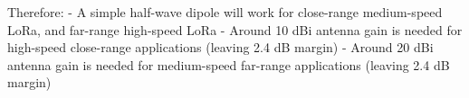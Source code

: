 Therefore:
- A simple half-wave dipole will work for close-range medium-speed LoRa, and far-range high-speed LoRa
- Around 10 dBi antenna gain is needed for high-speed close-range applications (leaving 2.4 dB margin)
- Around 20 dBi antenna gain is needed for medium-speed far-range applications (leaving 2.4 dB margin)